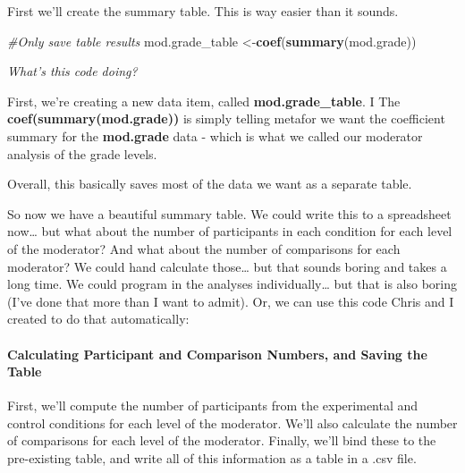 \documentclass[
]{book}
\newenvironment{Shaded}{\begin{snugshade}}{\end{snugshade}}
\newcommand{\CommentTok}[1]{\textcolor[rgb]{0.56,0.35,0.01}{\textit{#1}}}
\newcommand{\FunctionTok}[1]{\textcolor[rgb]{0.13,0.29,0.53}{\textbf{#1}}}
\newcommand{\NormalTok}[1]{#1}
\newcommand{\OtherTok}[1]{\textcolor[rgb]{0.56,0.35,0.01}{#1}}
\begin{document}
First we'll create the summary table. This is way easier than it sounds.

\begin{Shaded}
\begin{Highlighting}[]
\CommentTok{\#Only save table results }
\NormalTok{mod.grade\_table }\OtherTok{\textless{}{-}}\FunctionTok{coef}\NormalTok{(}\FunctionTok{summary}\NormalTok{(mod.grade))}
\end{Highlighting}
\end{Shaded}

\emph{What's this code doing?}

First, we're creating a new data item, called \textbf{mod.grade\_table}. I The \textbf{coef(summary(mod.grade))} is simply telling metafor we want the coefficient summary for the \textbf{mod.grade} data - which is what we called our moderator analysis of the grade levels.

Overall, this basically saves most of the data we want as a separate table.

So now we have a beautiful summary table. We could write this to a spreadsheet now\ldots{} but what about the number of participants in each condition for each level of the moderator? And what about the number of comparisons for each moderator? We could hand calculate those\ldots{} but that sounds boring and takes a long time. We could program in the analyses individually\ldots{} but that is also boring (I've done that more than I want to admit). Or, we can use this code Chris and I created to do that automatically:

\hypertarget{calculating-participant-and-comparison-numbers-and-saving-the-table}{%
\paragraph{Calculating Participant and Comparison Numbers, and Saving the Table}\label{calculating-participant-and-comparison-numbers-and-saving-the-table}}

First, we'll compute the number of participants from the experimental and control conditions for each level of the moderator. We'll also calculate the number of comparisons for each level of the moderator. Finally, we'll bind these to the pre-existing table, and write all of this information as a table in a .csv file.
\end{document}
